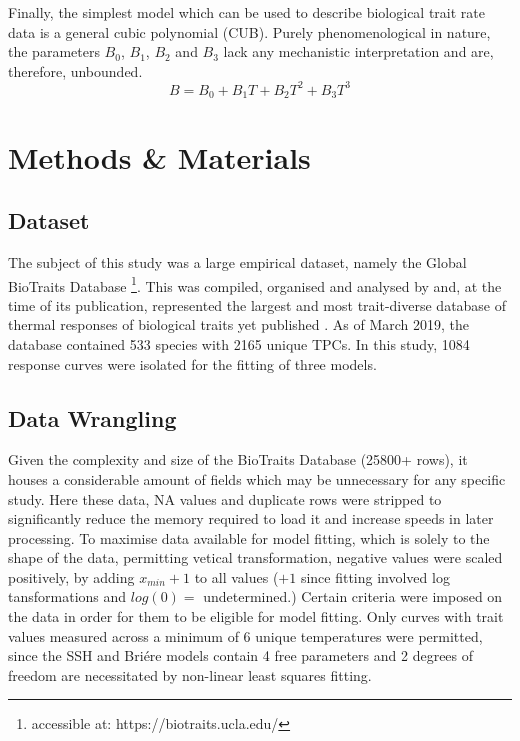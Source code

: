 \documentclass[11pt]{article}
\begin{document}
        Finally, the simplest model which can be used to describe biological trait rate data is a general cubic polynomial (CUB). Purely phenomenological in nature, the parameters $B_0$, $B_1$, $B_2$ and $B_3$ lack any mechanistic interpretation and are, therefore, unbounded.
        \begin{equation}
            B = B_{0} + B_{1}T + B_{2}T^2 + B_{3}T^3
        \end{equation}
        
    \section{Methods \& Materials}
        \subsection{Dataset}
            The subject of this study was a large empirical dataset, namely the Global BioTraits Database \footnote{accessible at: https://biotraits.ucla.edu/}. This was compiled, organised and analysed by \cite{dell2011systematic} and, at the time of its publication, represented the largest and most trait-diverse database of thermal responses of biological traits yet published \cite{dell2011systematic}. As of March 2019, the database contained 533 species with 2165 unique TPCs. In this study, 1084 response curves were isolated for the fitting of three models.
        \subsection{Data Wrangling}
            Given the complexity and size of the BioTraits Database (25800+ rows), it houses a considerable amount of fields which may be unnecessary for any specific study. Here these data, NA values and duplicate rows were stripped to significantly reduce the memory required to load it and increase speeds in later processing. To maximise data available for model fitting, which is solely to the shape of the data, permitting vetical transformation, negative values were scaled positively, by adding $x_{min} + 1$ to all values ($+1$ since fitting involved log tansformations and $log(0) =$ undetermined.) Certain criteria were imposed on the data in order for them to be eligible for model fitting. Only curves with trait values measured across a minimum of 6 unique temperatures were permitted, since the SSH and Bri\'ere models contain 4 free parameters and 2 degrees of freedom are necessitated by non-linear least squares fitting.
\end{document}
